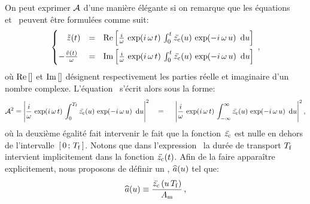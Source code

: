 \noindent On peut exprimer ${\mathcal{A}}$ d'une manière élégante si on remarque que les équations~ et~ peuvent être formulées comme suit:
\begin{equation}
	\begin{cases}
	~~~\zpt &= ~~ 
	\Reelle{ \frac{\im}{\PulsUh} \, \Expo{\im\,\PulsUh\,t} \, \IntegraleBornes{\ddzc(u) \, \Expo{-\im\,\PulsUh\,u}}
	{\ddint u}{0}{t} }
 \vspace{1ex}	\\
	-\frac{\vpt}{\PulsUh} &= ~~ 
	\Imaginaire{ \frac{\im}{\PulsUh} \, \Expo{\im\,\PulsUh\,t} \, \IntegraleBornes{\ddzc(u) \, \Expo{-\im\,\PulsUh\,u}}
	{\ddint u}{0}{t} }
	\end{cases}
	\virguleformule
	\label{eq:MouvZpVpExpo}
\end{equation}
où ${\mathop{\mathrm{Re}}\left[\right]}$ et ${\mathop{\mathrm{Im}}\left[\right]}$ désignent respectivement les parties réelle et imaginaire d'un nombre complexe. L'équation~ s'écrit alors sous la forme:
\[
	\Aosc^2 
	= \Module{
	\frac{\im}{\PulsUh} \, \Expo{\im\,\PulsUh\,t} \, \IntegraleBornes{\ddzc(u) \, \Expo{-\im\,\PulsUh\,u}}
	{\ddint u}{0}{\tfin}
	}^2 
	~~~ = ~~ ~~ \Module{
	\frac{\im}{\PulsUh} \, \Expo{\im\,\PulsUh\,t} \, \IntegraleBornes{\ddzc(u) \, \Expo{-\im\,\PulsUh\,u}}
	{\ddint u}{-\infty}{\infty}
	}^2 
	\virguleformule
\]
où la deuxième égalité fait intervenir le fait que la fonction ${\ddot{{z_{\rm c}}}}$ est nulle en dehors de l'intervalle~$\left[ \,0\, ;\, {T_{\rm f}} \,\right]$.
%
%
Notons que dans l'expression~ la durée de transport ${T_{\rm f}}$ intervient implicitement dans la fonction ${{\ddot{{z_{\rm c}}}}(t)}$. Afin de la faire apparaître explicitement, nous proposons de définir un \pacc {}, ${{\widehat{a}}({u})}$ %
%
tel que:
\begin{equation}
	\ddzcnv \equiv \frac{\ddzc\left(\tadim\,\tfin\right)}{\AccZc}
	\virguleformule
	\label{eq:ddzcnormalise}
\end{equation}
